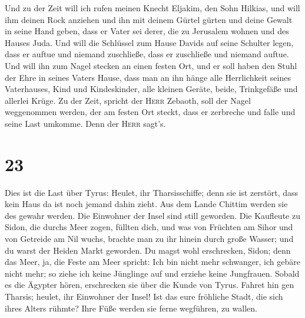  Und zu der Zeit will ich rufen meinen Knecht Eljakim,
den Sohn Hilkias,  und will ihm deinen Rock anziehen und
ihn mit deinem Gürtel gürten und deine Gewalt in seine Hand geben, dass
er Vater sei derer, die zu Jerusalem wohnen und des Hauses Juda.
 Und will die Schlüssel zum Hause Davids auf seine
Schulter legen, dass er auftue und niemand zuschließe, dass er
zuschließe und niemand auftue.  Und will ihn zum Nagel
stecken an einen festen Ort, und er soll haben den Stuhl der Ehre in
seines Vaters Hause,  dass man an ihn hänge alle
Herrlichkeit seines Vaterhauses, Kind und Kindeskinder, alle kleinen
Geräte, beide, Trinkgefäße und allerlei Krüge.  Zu der
Zeit, spricht der \textsc{Herr} Zebaoth, soll der Nagel weggenommen
werden, der am festen Ort steckt, dass er zerbreche und falle und seine
Last umkomme. Denn der \textsc{Herr} sagt's.

\hypertarget{section-22}{%
\section{23}\label{section-22}}

 Dies ist die Last über Tyrus: Heulet, ihr Tharsisschiffe;
denn sie ist zerstört, dass kein Haus da ist noch jemand dahin zieht.
Aus dem Lande Chittim werden sie des gewahr werden.  Die
Einwohner der Insel sind still geworden. Die Kaufleute zu Sidon, die
durchs Meer zogen, füllten dich,  und was von Früchten am
Sihor und von Getreide am Nil wuchs, brachte man zu ihr hinein durch
große Wasser; und du warst der Heiden Markt geworden.  Du
magst wohl erschrecken, Sidon; denn das Meer, ja, die Feste am Meer
spricht: Ich bin nicht mehr schwanger, ich gebäre nicht mehr; so ziehe
ich keine Jünglinge auf und erziehe keine Jungfrauen. 
Sobald es die Ägypter hören, erschrecken sie über die Kunde von Tyrus.
 Fahret hin gen Tharsis; heulet, ihr Einwohner der Insel!
 Ist das eure fröhliche Stadt, die sich ihres Alters
rühmte? Ihre Füße werden sie ferne wegführen, zu wallen.

